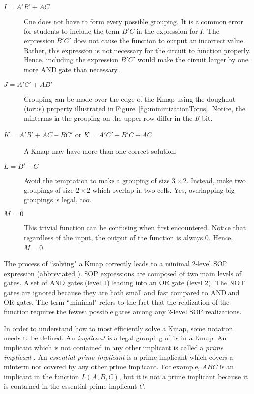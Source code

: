 \begin{changemargin}{1.5cm}{1.5cm}
\begin{description}
\item [$I=A'B'+AC$]
    One does not have to form every possible grouping.  It is
    a common error for students to include the term $B'C$ in the expression
    for $I$.  The expression $B'C'$  does not cause the function to output
    an incorrect value. Rather, this expression is not necessary for the
    circuit to function properly.  Hence, including the expression $B'C'$
    would make the circuit larger by one more AND gate than necessary.

\item [$J=A'C'+AB'$]
    Grouping can be made over the edge of the Kmap using the doughnut
     (torus) property illustrated in Figure~\ref{fig:minimizationTorus}.
    Notice, the minterms in the grouping on the upper row
    differ in the $B$ bit.

\item [$K=A'B'+AC+BC'$ or $K=A'C'+B'C+AC$]
    A Kmap may have more than one correct solution.

\item [$L=B'+C$]
    Avoid the temptation to make a grouping of size $3 \times 2$.
    Instead, make two groupings of size $2 \times 2$ which overlap
    in two cells.  Yes, overlapping big groupings is legal, too.

\item [$M=0$]
    This trivial function can be confusing when first encountered.
    Notice that regardless of the input, the output of the function
    is always 0.  Hence, $M=0$.
\end{description}
\end{changemargin}

The process of ``solving" a Kmap correctly leads to a minimal 2-level
SOP expression (abbreviated \SOPmin).  SOP expressions are composed
of two main levels of gates. A set of AND gates (level 1) leading
into an OR gate (level 2).  The NOT gates are ignored because they are
both small and fast compared to AND and OR gates.  The term ``minimal"
refers to the fact that the realization of the function requires
the fewest possible gates among any 2-level SOP realizations.

In order to understand how to most efficiently solve a Kmap, some
notation needs to be defined.
An \textit{implicant}  is a legal grouping of 1s in
a Kmap.  An implicant which is not contained in any other implicant
is called a \textit{prime implicant} .  An
\textit{essential prime implicant} 
is a prime implicant which covers a minterm not covered by any other
prime implicant. For example, $ABC$ is an implicant in the function
$L(A,B,C)$, but it is not a prime implicant because it is contained in
the essential prime implicant $C$.

